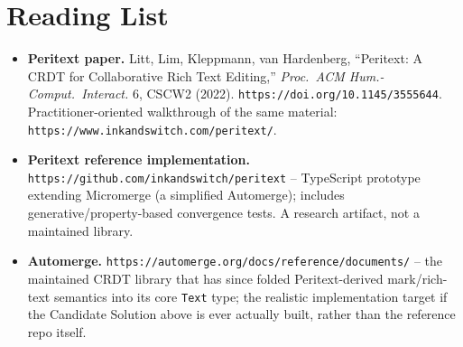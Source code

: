\documentclass{amsart}
\theoremstyle{remark}
\begin{document}
    \section{Reading List}
    \begin{itemize}
        \item \textbf{Peritext paper.} Litt, Lim, Kleppmann, van Hardenberg, ``Peritext: A CRDT for Collaborative Rich Text Editing,'' \emph{Proc.\ ACM Hum.-Comput.\ Interact.} 6, CSCW2 (2022). \texttt{https://doi.org/10.1145/3555644}. Practitioner-oriented walkthrough of the same material: \texttt{https://www.inkandswitch.com/peritext/}.
        \item \textbf{Peritext reference implementation.} \texttt{https://github.com/inkandswitch/peritext} -- TypeScript prototype extending Micromerge (a simplified Automerge); includes generative/property-based convergence tests. A research artifact, not a maintained library.
        \item \textbf{Automerge.} \texttt{https://automerge.org/docs/reference/documents/} -- the maintained CRDT library that has since folded Peritext-derived mark/rich-text semantics into its core \texttt{Text} type; the realistic implementation target if the Candidate Solution above is ever actually built, rather than the reference repo itself.
    \end{itemize}
\end{document}

